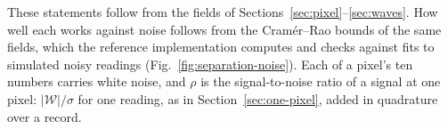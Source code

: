 
These statements follow from the fields of
Sections~\ref{sec:pixel}--\ref{sec:waves}. How well each works against noise
follows from the Cram\'er--Rao bounds of the same fields, which the reference
implementation computes and checks against fits to simulated noisy readings
(Fig.~\ref{fig:separation-noise}). Each of a pixel's ten numbers carries white
noise, and $\rho$ is the signal-to-noise ratio of a signal at one pixel:
$|\mathcal{W}|/\sigma$ for one reading, as in Section~\ref{sec:one-pixel}, added
in quadrature over a record.

